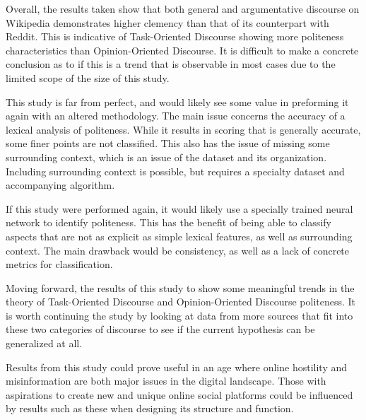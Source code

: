 \documentclass{article}
\begin{document}
Overall, the results taken show that both general and argumentative discourse on Wikipedia demonstrates higher clemency than that of its counterpart with Reddit. This is indicative of Task-Oriented Discourse showing more politeness characteristics than Opinion-Oriented Discourse. It is difficult to make a concrete conclusion as to if this is a trend that is observable in most cases due to the limited scope of the size of this study. 

This study is far from perfect, and would likely see some value in preforming it again with an altered methodology. The main issue concerns the accuracy of a lexical analysis of politeness. While it results in scoring that is generally accurate, some finer points are not classified. This also has the issue of missing some surrounding context, which is an issue of the dataset and its organization. Including surrounding context is possible, but requires a specialty dataset and accompanying algorithm.

If this study were performed again, it would likely use a specially trained neural network to identify politeness. This has the benefit of being able to classify aspects that are not as explicit as simple lexical features, as well as surrounding context. The main drawback would be consistency, as well as a lack of concrete metrics for classification.

Moving forward, the results of this study to show some meaningful trends in the theory of Task-Oriented Discourse and Opinion-Oriented Discourse politeness. It is worth continuing the study by looking at data from more sources that fit into these two categories of discourse to see if the current hypothesis can be generalized at all.

Results from this study could prove useful in an age where online hostility and misinformation are both major issues in the digital landscape. Those with aspirations to create new and unique online social platforms could be influenced by results such as these when designing its structure and function.

\newpage


\end{document}
